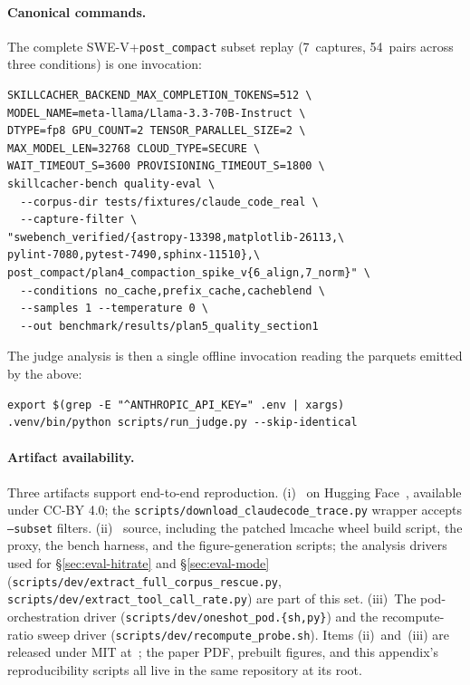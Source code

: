 \paragraph{Canonical commands.} The complete SWE-V+\texttt{post\_compact} subset replay
(7~captures, 54~pairs across three conditions) is one invocation:
\begin{lstlisting}[basicstyle=\ttfamily\scriptsize, frame=single,
                   framesep=4pt, breaklines=true]
SKILLCACHER_BACKEND_MAX_COMPLETION_TOKENS=512 \
MODEL_NAME=meta-llama/Llama-3.3-70B-Instruct \
DTYPE=fp8 GPU_COUNT=2 TENSOR_PARALLEL_SIZE=2 \
MAX_MODEL_LEN=32768 CLOUD_TYPE=SECURE \
WAIT_TIMEOUT_S=3600 PROVISIONING_TIMEOUT_S=1800 \
skillcacher-bench quality-eval \
  --corpus-dir tests/fixtures/claude_code_real \
  --capture-filter \
"swebench_verified/{astropy-13398,matplotlib-26113,\
pylint-7080,pytest-7490,sphinx-11510},\
post_compact/plan4_compaction_spike_v{6_align,7_norm}" \
  --conditions no_cache,prefix_cache,cacheblend \
  --samples 1 --temperature 0 \
  --out benchmark/results/plan5_quality_section1
\end{lstlisting}
The judge analysis is then a single offline invocation reading
the parquets emitted by the above:
\begin{lstlisting}[basicstyle=\ttfamily\scriptsize, frame=single,
                   framesep=4pt, breaklines=true]
export $(grep -E "^ANTHROPIC_API_KEY=" .env | xargs)
.venv/bin/python scripts/run_judge.py --skip-identical
\end{lstlisting}

\paragraph{Artifact availability.} Three artifacts support
end-to-end reproduction. (i)~\dataset{} on Hugging
Face~\cite{claudecode-trace-hf}, available under CC-BY 4.0; the
\texttt{scripts/download\_claudecode\_trace.py} wrapper accepts
\texttt{--subset} filters. (ii)~\sys{} source, including the
patched lmcache wheel build script, the proxy, the bench harness,
and the figure-generation scripts; the analysis drivers used for
\S\ref{sec:eval-hitrate} and \S\ref{sec:eval-mode}
(\texttt{scripts/dev/extract\_\allowbreak{}full\_\allowbreak{}corpus\_\allowbreak{}rescue.py},
\texttt{scripts/dev/extract\_\allowbreak{}tool\_\allowbreak{}call\_\allowbreak{}rate.py})
are part of this set. (iii)~The pod-orchestration driver
(\texttt{scripts/dev/oneshot\_pod.\{sh,py\}}) and the recompute-ratio
sweep driver (\texttt{scripts/dev/recompute\_probe.sh}). Items
(ii)~and~(iii) are released under MIT
at~\cite{skillcacher-source}; the paper PDF, prebuilt figures, and
this appendix's reproducibility scripts all live in the same
repository at its root.

